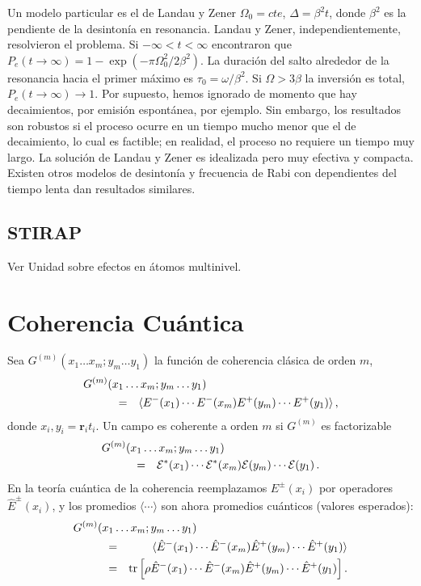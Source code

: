 \documentclass[twocolumn,aps,eqsecnum]{revtex4}
\providecommand{\tr}[1]{\text{tr}\left[ #1 \right]}
\begin{document}
Un modelo particular es el de Landau y Zener $\Omega_0 =cte$, 
$\Delta = \beta^2 t$, donde $\beta^2$ es la pendiente de la desinton\'ia en 
resonancia. Landau y Zener, independientemente, resolvieron el problema. 
Si $-\infty < t < \infty$ encontraron que 
$P_e (t \to \infty) = 1- \exp{ (-\pi \Omega_0^2/2\beta^2) }$. La duraci\'on 
del salto alrededor de la resonancia hacia el primer m\'aximo es 
$\tau_0 = \omega/\beta^2$. Si $\Omega > 3\beta$ la inversi\'on es total, 
$P_e (t \to \infty) \to 1$. Por supuesto, hemos ignorado de momento que 
hay decaimientos, por emisi\'on espont\'anea, por ejemplo. Sin embargo, 
los resultados son robustos si el proceso ocurre en un tiempo mucho 
menor que el de decaimiento, lo cual es factible; en realidad, el proceso 
no requiere un tiempo muy largo. La soluci\'on de Landau y Zener es 
idealizada pero muy efectiva y compacta. Existen otros modelos de 
desinton\'ia y frecuencia de Rabi con dependientes del tiempo lenta dan 
resultados similares.  


\subsection{STIRAP}
Ver Unidad sobre efectos en \'atomos multinivel. 


\section{Coherencia Cu\'antica} 
Sea $G^{(m)}(x_1 \ldots x_m; y_m \ldots y_1)$ la funci\'on de coherencia 
cl\'asica de orden $m$, 
%
\begin{eqnarray*}
\lefteqn{G^{(m)}(x_1 \ldots x_m; y_m \ldots y_1) } \hspace{1cm}	\\
&=& \langle E^-(x_1) \cdots E^-(x_m) E^+(y_m) \cdots E^+(y_1) \rangle \,, 
\end{eqnarray*}
donde $x_i,y_i =\mathbf{r}_i t_i$. Un campo es coherente a orden $m$ si 
$G^{(m)}$ es factorizable 
%
\begin{eqnarray*}
\lefteqn{ G^{(m)}(x_1 \ldots x_m; y_m \ldots y_1) } \hspace{1cm}	\\
&=&  \mathcal{E}^{\ast}(x_1) \cdots \mathcal{E}^{\ast}(x_m) 
	\mathcal{E} (y_m) \cdots \mathcal{E} (y_1) \,. 
\end{eqnarray*}
En la teor\'ia cu\'antica de la coherencia reemplazamos $E^{\pm}(x_i)$ 
por operadores $\hat{E}^{\pm}(x_i)$, y los promedios 
$\langle \cdots \rangle$ son ahora promedios cu\'anticos (valores 
esperados): 
%
\begin{eqnarray*}
\lefteqn{ G^{(m)}(x_1 \ldots x_m; y_m \ldots y_1) } \hspace{1cm}	\\
&=& \langle \hat{E}^-(x_1) \cdots \hat{E}^-(x_m) \hat{E}^+(y_m) 
    \cdots \hat{E}^+(y_1) \rangle  \\ 
&=& \tr{ \rho \hat{E}^-(x_1) \cdots \hat{E}^-(x_m) \hat{E}^+(y_m) 
    \cdots \hat{E}^+(y_1) } . 
\end{eqnarray*}
\end{document}
